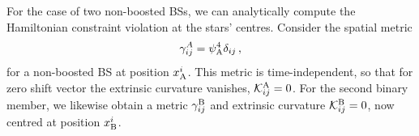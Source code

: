 For the case of two non-boosted BSs, we can analytically
compute the Hamiltonian constraint violation
at the stars' centres. Consider the spatial metric
%
%
\begin{equation}
    \gamma_{ij}^{A} = \psi_{\rm A}^4 \delta_{ij}\,,\label{mal:eqn:appendixansatzmetric}
\end{equation}
%
for a non-boosted BS at position $x_{\rm A}^i$.
This metric is time-independent,
so that for zero shift vector the extrinsic curvature vanishes,
%
${\mathcal{K}}_{ij}^{\rm A} = 0$.
%
For the second binary member, we likewise obtain a
metric $\gamma^{\rm B}_{ij}$ and extrinsic curvature
${\mathcal{K}}^{\rm B}_{ij}=0$, now centred at position $x_{\rm B}^i$.


